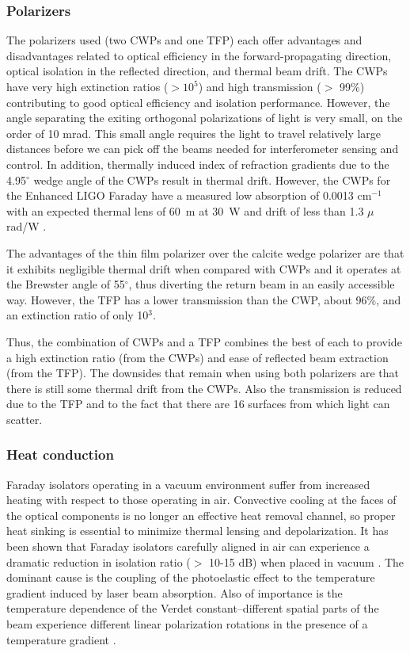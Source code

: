 \subsubsection{Polarizers}  
The polarizers used (two CWPs and one TFP) each offer advantages and
disadvantages related to optical efficiency in the forward-propagating
direction, optical isolation in the reflected direction, and thermal
beam drift. The CWPs have very high extinction ratios ($>10^5$) and
high transmission ($>$ 99\%) contributing to good optical efficiency
and isolation performance. However, the angle separating the exiting
orthogonal polarizations of light is very small, on the order of 10
mrad. This small angle requires the light to travel relatively large distances
before we can pick off the beams
needed for interferometer sensing and control. In addition, thermally
induced index of refraction gradients due to the 4.95$^{\circ}$ wedge
angle of the CWPs result in thermal drift. However, the CWPs for the
Enhanced LIGO Faraday have a measured low absorption of 0.0013
cm$^{-1}$
with an expected thermal lens of 60~m at 30~W and drift of less than
1.3 $\mu$rad/W \citep{UFLIGOGroup2006Upgrading}.

The advantages of the thin film polarizer over the calcite wedge
polarizer are that it exhibits negligible thermal drift when compared
with CWPs and it operates at the Brewster angle of 55$^\circ$, thus
diverting the return beam in an easily accessible way. However, the
TFP has a lower transmission than the CWP, about 96\%, and an
extinction ratio of only 10$^3$.

Thus, the combination of CWPs and a TFP combines the best of each to
provide a high extinction ratio (from the CWPs) and ease of reflected
beam extraction (from the TFP). The downsides that remain when using
both polarizers are that there is still some thermal drift from the
CWPs. Also the transmission is reduced due to the TFP and to the fact
that there are 16 surfaces from which light can scatter.

\subsubsection{Heat conduction}
\label{sec:heatconduction}
Faraday isolators operating in a vacuum environment suffer from
increased heating with respect to those operating in air. Convective
cooling at the faces of the optical components is no longer an
effective heat removal channel, so proper heat sinking is essential to
minimize thermal lensing and depolarization. It has been shown that
Faraday isolators carefully aligned in air can experience a dramatic
reduction in isolation ratio ($>$ 10-15 dB) when placed in vacuum
\citep{TheVIRGOCollaboration2008Invacuum}. The dominant cause is the
coupling of the photoelastic effect to the temperature gradient
induced by laser beam absorption. Also of importance is the
temperature dependence of the Verdet constant--different spatial parts
of the beam experience different linear polarization rotations in the presence
of a temperature gradient \cite{Barnes1992Variation}.


